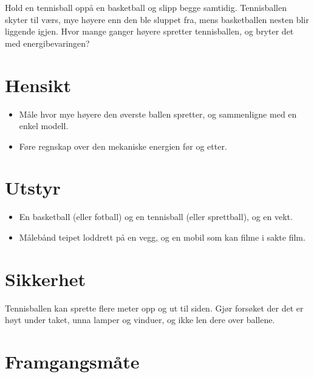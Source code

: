 \documentclass[11pt]{article}
\begin{document}

Hold en tennisball oppå en basketball og slipp begge samtidig. Tennisballen skyter til værs, mye høyere enn den ble sluppet fra, mens basketballen nesten blir liggende igjen. Hvor mange ganger høyere spretter tennisballen, og bryter det med energibevaringen?

\section*{Hensikt}

\begin{itemize}
\item Måle hvor mye høyere den øverste ballen spretter, og sammenligne med en enkel modell.
\item Føre regnskap over den mekaniske energien før og etter.
\end{itemize}

\section*{Utstyr}

\begin{itemize}
\item En basketball (eller fotball) og en tennisball (eller sprettball), og en vekt.
\item Målebånd teipet loddrett på en vegg, og en mobil som kan filme i sakte film.
\end{itemize}

\section*{Sikkerhet}

Tennisballen kan sprette flere meter opp og ut til siden. Gjør forsøket der det er høyt under taket, unna lamper og vinduer, og ikke len dere over ballene.

\section*{Framgangsmåte}
\end{document}

